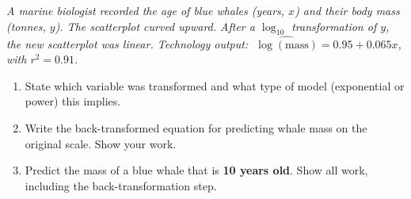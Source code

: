 \documentclass[10pt]{article}
\begin{document}
\namedateperiod

\vspace{0.18in}

\begin{tcolorbox}[colback=sky, colframe=navy, boxrule=0.9pt, arc=2mm,
    left=4mm, right=4mm, top=2.5mm, bottom=2.5mm]
\small\textit{A marine biologist recorded the age of blue whales (years, $x$) and their body
mass (tonnes, $y$). The scatterplot curved upward. After a $\log_{10}$ transformation of $y$,
the new scatterplot was linear. Technology output:
$\;\widehat{\log(\text{mass})} = 0.95 + 0.065x$, with $r^2 = 0.91$.}
\end{tcolorbox}

\vspace{0.16in}

\begin{enumerate}[leftmargin=1.6em, itemsep=0.16in]

  \item State which variable was transformed and what type of model (exponential or power)
        this implies.\\[8pt]

  \item Write the back-transformed equation for predicting whale mass on the original scale.
        Show your work.\\[8pt]

  \item Predict the mass of a blue whale that is \textbf{10 years old}. Show all work,
        including the back-transformation step.\\[8pt]

\end{enumerate}

\vspace{0.12in}
\end{document}
